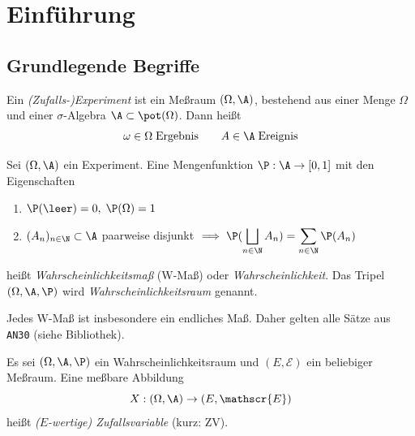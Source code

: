 \documentclass[11pt, a4paper]{article}
\begin{document}

\tableofcontents

\newpage

\section{Einführung}

\subsection{Grundlegende Begriffe}

\begin{definition}[Experiment]
    Ein \emph{(Zufalls-)Experiment} ist ein Meßraum $(\Omega, \A)$, bestehend aus einer Menge $\Omega$ und einer $\sigma$-Algebra $\A \subset \pot(\Omega)$. Dann heißt
    $$\omega \in \Omega \; \text{Ergebnis} \qquad A \in \A \; \text{Ereignis}$$
\end{definition}


\begin{definition}[Kolmogorov 1933]
    Sei $(\Omega, \A)$ ein Experiment. Eine Mengenfunktion $\P: \A \to [0,1]$ mit den Eigenschaften
    \begin{enumerate}
        \item[(M1)] $\P(\leer) = 0, \; \P(\Omega) = 1$
        \item[(M2)] $(A_n)_{n\in\N} \subset \A$ paarweise disjunkt $\displaystyle\;\Longrightarrow\; \P(\bigsqcup_{n\in \N} A_n) = \sum_{n\in \N} \P(A_n)$
    \end{enumerate}
    heißt \emph{Wahrscheinlichkeitsmaß} (W-Maß) oder \emph{Wahrscheinlichkeit}. Das Tripel $(\Omega, \A, \P)$ wird \emph{Wahrscheinlichkeitsraum} genannt.
\end{definition}

\begin{note}
    Jedes W-Maß ist insbesondere ein endliches Maß. Daher gelten alle Sätze aus \texttt{AN30} (siehe Bibliothek).
\end{note}

\begin{definition}
    Es sei $(\Omega, \A, \P)$ ein Wahrscheinlichkeitsraum und $(E, \mathscr{E})$ ein beliebiger Meßraum. Eine meßbare Abbildung
    $$X: (\Omega, \A) \to (E, \mathscr{E})$$
    heißt \emph{($E$-wertige) Zufallsvariable} (kurz: ZV).
\end{definition}
\end{document}

